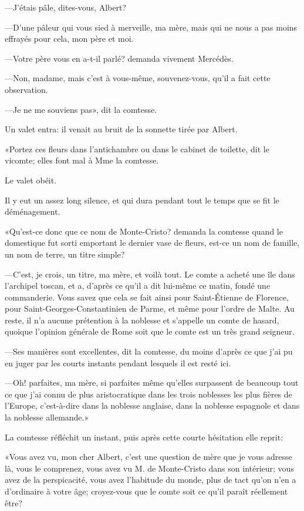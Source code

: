 —J'étais pâle, dites-vous, Albert? 

—D'une pâleur qui vous sied à merveille, ma mère, mais qui ne nous a pas moins effrayés pour cela, mon père et moi. 

—Votre père vous en a-t-il parlé? demanda vivement Mercédès. 

—Non, madame, mais c'est à vous-même, souvenez-vous, qu'il a fait cette observation. 

—Je ne me souviens pas», dit la comtesse. 

Un valet entra: il venait au bruit de la sonnette tirée par Albert. 

«Portez ces fleurs dans l'antichambre ou dans le cabinet de toilette, dit le vicomte; elles font mal à Mme la comtesse. 

Le valet obéit. 

Il y eut un assez long silence, et qui dura pendant tout le temps que se fit le déménagement. 

«Qu'est-ce donc que ce nom de Monte-Cristo? demanda la comtesse quand le domestique fut sorti emportant le dernier vase de fleurs, est-ce un nom de famille, un nom de terre, un titre simple?  

—C'est, je crois, un titre, ma mère, et voilà tout. Le comte a acheté une île dans l'archipel toscan, et a, d'après ce qu'il a dit lui-même ce matin, fondé une commanderie. Vous savez que cela se fait ainsi pour Saint-Étienne de Florence, pour Saint-Georges-Constantinien de Parme, et même pour l'ordre de Malte. Au reste, il n'a aucune prétention à la noblesse et s'appelle un comte de hasard, quoique l'opinion générale de Rome soit que le comte est un très grand seigneur. 

—Ses manières sont excellentes, dit la comtesse, du moins d'après ce que j'ai pu en juger par les courts instants pendant lesquels il est resté ici. 

—Oh! parfaites, ma mère, si parfaites même qu'elles surpassent de beaucoup tout ce que j'ai connu de plus aristocratique dans les trois noblesses les plus fières de l'Europe, c'est-à-dire dans la noblesse anglaise, dans la noblesse espagnole et dans la noblesse allemande.» 

La comtesse réfléchit un instant, puis après cette courte hésitation elle reprit: 

«Vous avez vu, mon cher Albert, c'est une question de mère que je vous adresse là, vous le comprenez, vous avez vu M. de Monte-Cristo dans son intérieur; vous avez de la perspicacité, vous avez l'habitude du monde, plus de tact qu'on n'en a d'ordinaire à votre âge; croyez-vous que le comte soit ce qu'il paraît réellement être?  

